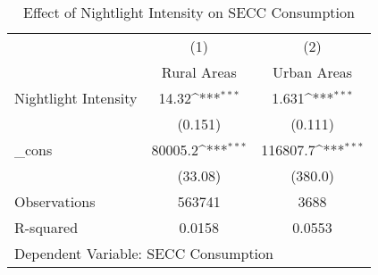 \begin{table}[htbp]\centering
\def\sym#1{\ifmmode^{#1}\else\(^{#1}\)\fi}
\caption{Effect of Nightlight Intensity on SECC Consumption}
\begin{tabular}{l*{2}{c}}
\toprule
                    &\multicolumn{1}{c}{(1)}&\multicolumn{1}{c}{(2)}\\
                    &\multicolumn{1}{c}{Rural Areas}&\multicolumn{1}{c}{Urban Areas}\\
\midrule
Nightlight Intensity&       14.32\sym{***}&       1.631\sym{***}\\
                    &     (0.151)         &     (0.111)         \\
\_cons              &     80005.2\sym{***}&    116807.7\sym{***}\\
                    &     (33.08)         &     (380.0)         \\
\midrule
Observations        &      563741         &        3688         \\
R-squared           &      0.0158         &      0.0553         \\
\bottomrule
\multicolumn{3}{l}{\footnotesize Dependent Variable: SECC Consumption}\\
\end{tabular}
\end{table}
